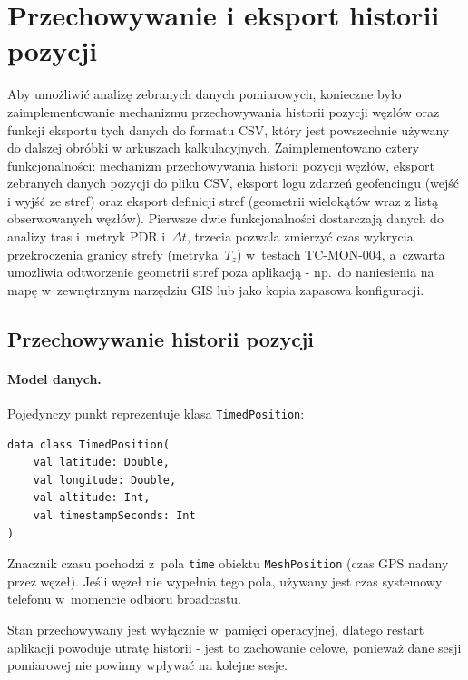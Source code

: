 \section{Przechowywanie i eksport historii pozycji}
\label{sec:historia-eksport}

Aby umożliwić analizę zebranych danych pomiarowych, konieczne było zaimplementowanie mechanizmu
przechowywania historii pozycji węzłów oraz funkcji eksportu tych danych do formatu CSV,
który jest powszechnie używany do dalszej obróbki w arkuszach kalkulacyjnych.
Zaimplementowano cztery funkcjonalności: mechanizm przechowywania historii pozycji węzłów,
eksport zebranych danych pozycji do pliku CSV, eksport logu zdarzeń
geofencingu (wejść i wyjść ze stref) oraz eksport definicji stref (geometrii wielokątów
wraz z listą obserwowanych węzłów). Pierwsze dwie funkcjonalności dostarczają danych do analizy
tras i~metryk PDR i~$\Delta t$, trzecia pozwala zmierzyć czas wykrycia przekroczenia granicy strefy
(metryka~$T_z$) w~testach TC-MON-004, a~czwarta umożliwia odtworzenie geometrii stref poza
aplikacją - np.\ do naniesienia na mapę w~zewnętrznym narzędziu GIS lub jako kopia zapasowa
konfiguracji.

\subsection*{Przechowywanie historii pozycji}
\label{sec:historia}

\paragraph{Model danych.}

Pojedynczy punkt reprezentuje klasa \texttt{TimedPosition}:

\begin{lstlisting}[caption={Klasa \texttt{TimedPosition} - pojedynczy punkt},
                   label={lst:timed-position}]
data class TimedPosition(
    val latitude: Double,
    val longitude: Double,
    val altitude: Int,
    val timestampSeconds: Int
)
\end{lstlisting}

Znacznik czasu pochodzi z~pola \texttt{time} obiektu \texttt{MeshPosition} (czas GPS
nadany przez węzeł). Jeśli węzeł nie wypełnia tego pola, używany jest czas systemowy
telefonu w~momencie odbioru broadcastu.

Stan przechowywany jest wyłącznie w~pamięci operacyjnej, dlatego restart aplikacji
powoduje utratę historii - jest to zachowanie celowe, ponieważ dane sesji pomiarowej
nie powinny wpływać na kolejne sesje.

